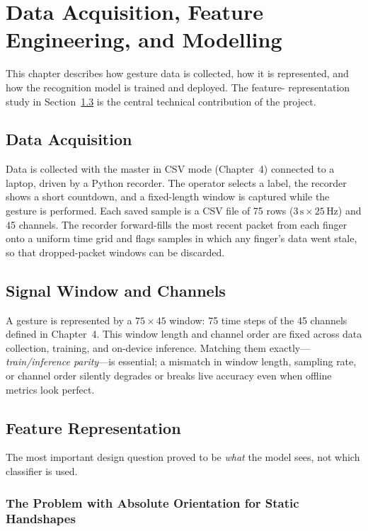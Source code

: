 \chapter{Data Acquisition, Feature Engineering, and Modelling}

This chapter describes how gesture data is collected, how it is represented,
and how the recognition model is trained and deployed. The feature-%
representation study in Section~\ref{sec:features} is the central technical
contribution of the project.

\section{Data Acquisition}

Data is collected with the master in CSV mode (Chapter~4) connected to a
laptop, driven by a Python recorder. The operator selects a label, the recorder
shows a short countdown, and a fixed-length window is captured while the
gesture is performed. Each saved sample is a CSV file of 75 rows
($3\,\text{s} \times 25\,\text{Hz}$) and 45 channels. The recorder forward-fills
the most recent packet from each finger onto a uniform time grid and flags
samples in which any finger's data went stale, so that dropped-packet windows
can be discarded.

\section{Signal Window and Channels}

A gesture is represented by a $75 \times 45$ window: 75 time steps of the 45
channels defined in Chapter~4. This window length and channel order are fixed
across data collection, training, and on-device inference. Matching them
exactly—\emph{train/inference parity}—is essential; a mismatch in window
length, sampling rate, or channel order silently degrades or breaks live
accuracy even when offline metrics look perfect.

\section{Feature Representation}\label{sec:features}

The most important design question proved to be \emph{what} the model sees, not
which classifier is used.

\subsection{The Problem with Absolute Orientation for Static Handshapes}

